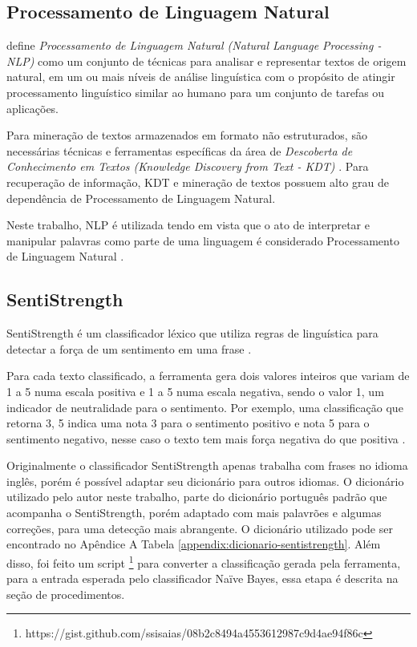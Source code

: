 \subsection{Processamento de Linguagem Natural}
 define \textit{Processamento de Linguagem Natural (Natural Language Processing - NLP)} como um conjunto de técnicas para analisar e representar textos de origem natural, em um ou mais níveis de análise linguística com o propósito de atingir processamento linguístico similar ao humano para um conjunto de tarefas ou aplicações. 

Para mineração de textos armazenados em formato não estruturados, são necessárias técnicas e ferramentas específicas da área de \textit{Descoberta de Conhecimento em Textos (Knowledge Discovery from Text - KDT)} \cite{morais2007mineraccao}. Para recuperação de informação, KDT e mineração de textos possuem alto grau de dependência de Processamento de Linguagem Natural.

Neste trabalho, NLP é utilizada tendo em vista que o ato de interpretar e manipular palavras como parte de uma linguagem é considerado Processamento de Linguagem Natural \cite{morais2007mineraccao}.


\subsection{SentiStrength}
SentiStrength é um classificador léxico que utiliza regras de linguística para detectar a força de um sentimento em uma frase \cite{thelwall2012sentistrength}.

Para cada texto classificado, a ferramenta gera dois valores inteiros que variam de 1 a 5 numa escala positiva e 1 a 5 numa escala negativa, sendo o valor 1, um indicador de neutralidade para o sentimento. Por exemplo, uma classificação que retorna 3, 5 indica uma nota 3 para o sentimento positivo e nota 5 para o sentimento negativo, nesse caso o texto tem mais força negativa do que positiva \cite{thelwall2012sentistrength}.

Originalmente o classificador SentiStrength apenas trabalha com frases no idioma inglês, porém é possível adaptar seu dicionário para outros idiomas. O dicionário utilizado pelo autor neste trabalho, parte do dicionário português padrão que acompanha o SentiStrength, porém adaptado com mais palavrões e algumas correções, para uma detecção mais abrangente. O dicionário utilizado pode ser encontrado no Apêndice A Tabela \ref{appendix:dicionario-sentistrength}. Além disso, foi feito um script \footnote{https://gist.github.com/ssisaias/08b2c8494a4553612987c9d4ae94f86c} para converter a classificação gerada pela ferramenta, para a entrada esperada pelo classificador Naïve Bayes, essa etapa é descrita na seção de procedimentos.

